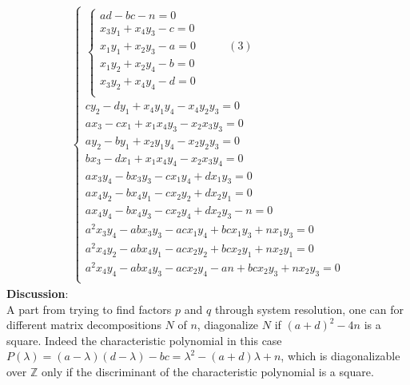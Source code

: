 \documentclass[sigconf,balance=false]{acmart}
\begin{document}
\begin{eqnarray}\label{syst}
	\left\lbrace
	\begin{array}{ll}
	\left\lbrace
	\begin{array}{ll}
	ad - bc - n=0\\
	x_{3}y_{1} + x_{4}y_{3}-c=0\\
	x_{1}y_{1} + x_{2}y_{3}-a=0 \ \ \ \ \ \ \ \ \ \ \ \ \ (3)\\
	x_{1}y_{2} + x_{2}y_{4}-b=0\\
	x_{3}y_{2} + x_{4}y_{4}-d=0\\
	\end{array} \right.\\
	cy_{2} - dy_{1} + x_{4}y_{1}y_{4} - x_{4}y_{2}y_{3}=0\\
	ax_{3} - cx_{1} + x_{1}x_{4}y_{3} - x_{2}x_{3}y_{3}=0\\
	ay_{2} - by_{1} + x_{2}y_{1}y_{4} - x_{2}y_{2}y_{3}=0\\
	bx_{3} - dx_{1} + x_{1}x_{4}y_{4} - x_{2}x_{3}y_{4}=0\\
	ax_{3}y_{4} - bx_{3}y_{3} - cx_{1}y_{4} + dx_{1}y_{3}=0\\
	ax_{4}y_{2} - bx_{4}y_{1} - cx_{2}y_{2} + dx_{2}y_{1}=0\\
	ax_{4}y_{4} - bx_{4}y_{3} - cx_{2}y_{4} + dx_{2}y_{3} - n=0\\
	a^{2}x_{3}y_{4} - abx_{3}y_{3} - acx_{1}y_{4} + bcx_{1}y_{3} + nx_{1}y_{3}=0\\
	a^{2}x_{4}y_{2} - abx_{4}y_{1} - acx_{2}y_{2} + bcx_{2}y_{1} + nx_{2}y_{1}=0\\
	a^{2}x_{4}y_{4} - abx_{4}y_{3} - acx_{2}y_{4} - an + bcx_{2}y_{3} + nx_{2}y_{3}=0\\
	\end{array} \right.
\end{eqnarray}
\textbf{Discussion}:\\
A part from trying to find factors $p$ and $q$ through system resolution, one can for different matrix decompositions $N$ of $n$, diagonalize $N$ if $(a+d)^2-4n$ is a square. Indeed the characteristic polynomial in this case $P(\lambda)=(a-\lambda)(d-\lambda)-bc=\lambda^2-(a+d)\lambda+n$, which is diagonalizable over $\mathbb{Z}$ only if the discriminant of the characteristic polynomial is a square. 
\end{document}
